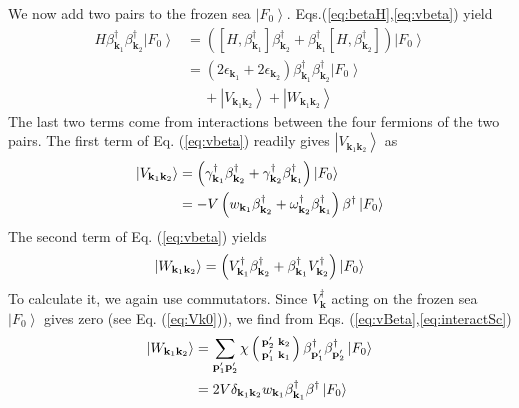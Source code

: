 \documentclass[aps,prb,superscriptaddress,showpacs,reprint,lengthcheck]{revtex4}
\newcommand{\vk}{\ensuremath{\mathbf{k}}}
\newcommand{\vp}{\ensuremath{\mathbf{p}}}
\begin{document}
We now add two pairs to the frozen sea $\left|F_0\right>$. Eqs.(\ref{eq:betaH},\ref{eq:vbeta}) yield 
\begin{equation}  \label{eq:SchTwo}
\begin{split}
H\beta^{\dagger}_{\mathbf{k} _1}\beta^{\dagger}_{\mathbf{k}
_2}\left|F_0\right>   &=\left(\left[H,\beta^{\dagger}_{\mathbf{k} _1}\right]
\beta^{\dagger}_{\mathbf{k} _2}+\beta^{\dagger}_{\mathbf{k} _1}\left[%
H,\beta^{\dagger}_{\mathbf{k} _2}\right]  \right) \left|F_0\right>   \\
&=\left(2\epsilon_{\mathbf{k} _1}+2\epsilon_{\mathbf{k} _2}\right)
\beta^{\dagger}_{\mathbf{k} _1}\beta^{\dagger}_{\mathbf{k}
_2}\left|F_0\right>\\
&\quad\:   +\left|V_{\mathbf{k} _1\mathbf{k} _2}\right>+\left|W_{\mathbf{k} _1\mathbf{k} _2}\right>  
\end{split}%
\end{equation}
The last two terms come from interactions between the four fermions of the two pairs.  The first term of Eq. (\ref{eq:vbeta}) readily gives $\left|V_{\mathbf{k} _1\mathbf{k} _2}\right> $ as 
\begin{equation}
\begin{split}
\left|V_{\mathbf{k} _1\mathbf{k} _2}\right>& =\left(\gamma^{\dagger}_{\mathbf{%
k} _1}\beta^{\dagger}_{\mathbf{k} _2}+\gamma^{\dagger}_{\mathbf{k}
_2}\beta^{\dagger}_{\mathbf{k} _1}\right) \left|F_0\right> \\
&=-V\left(w_{\mathbf{k} _1}\beta^{\dagger}_{\mathbf{k} _2}+\omega^{\dagger}_{\mathbf{k}
_2}\beta^{\dagger}_{\mathbf{k} _1}\right)\beta^\dagger \left|F_0\right>  
\end{split}
\end{equation}
The second term of Eq. (\ref{eq:vbeta}) yields
\begin{equation}
\left|W_{\mathbf{k} _1\mathbf{k} _2}\right> =\left(V^{\dagger}_{\mathbf{%
k} _1}\beta^{\dagger}_{\mathbf{k} _2}+\beta^{\dagger}_{\mathbf{k}
_1}V^{\dagger}_{\mathbf{k} _2}\right) \left|F_0\right> 
\end{equation}
To calculate it, we again use commutators.  Since  $V^{\dagger}_{\mathbf{k}}$ acting on the frozen sea $\left|F_0\right>$ gives zero (see Eq. (\ref{eq:Vk0})), we find from Eqs. (\ref{eq:vBeta},\ref{eq:interactSc}) 
\begin{equation}\label{eq:omega2}
\begin{split}
\left|W_{\mathbf{k} _1\mathbf{k} _2}\right>&=\sum_{\mathbf{p} ^{\prime}_1\mathbf{p}
^{\prime}_2}\chi\left(\begin{smallmatrix}\vp'_2&\vk_2\\\vp'_1&\vk_1%
\end{smallmatrix}\right)  \beta^{\dagger}_{\mathbf{p} ^{\prime}_1}\beta^{%
\dagger}_{\mathbf{p} ^{\prime}_2}\left|F_0\right> \\
&=2V\delta_{\mathbf{k} _1\mathbf{k} _2}w_{\mathbf{k} _1}\beta^{\dagger}_{
\mathbf{k} _1} \beta^{\dagger}\left|F_0\right> 
\end{split}
\end{equation}
\end{document}
